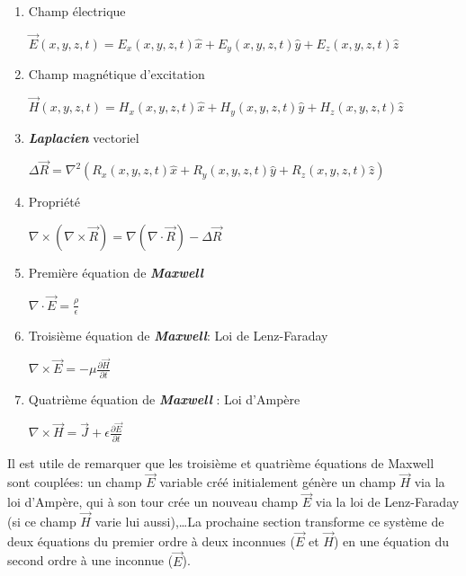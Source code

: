 \begin{enumerate}
\item{Champ électrique} \begin{center}$\vec{E}(x,y,z,t) = E_{x}(x,y,z,t) \hat{x} + E_{y}(x,y,z,t) \hat{y} + E_{z}(x,y,z,t) \hat{z}$\end{center} 
\item{Champ magnétique d'excitation } \begin{center}$\vec{H}(x,y,z,t) = H_{x}(x,y,z,t) \hat{x} + H_{y}(x,y,z,t) \hat{y} + H_{z}(x,y,z,t) \hat{z}$\end{center} 
\item{\textit{\textbf{Laplacien}} vectoriel} \begin{center} $\Delta \vec{R} = \nabla^{2}\left(R_{x}(x,y,z,t) \hat{x} + R_{y}(x,y,z,t) \hat{y} + R_{z}(x,y,z,t) \hat{z}\right) $\end{center} 
\item{Propriété} 
\begin{center}$\nabla \times (\nabla \times \vec{R}) = \nabla(\nabla \cdot \vec{R}) - \Delta \vec{R} $\end{center} 
\item{Première équation de \textit{\textbf{Maxwell}}} 
\begin{center}$\nabla \cdot \vec{E} = \frac{\rho}{\epsilon}$\end{center} 
\item{Troisième équation de \textit{\textbf{Maxwell}}: Loi de Lenz-Faraday}
\begin{center}
$\nabla \times \vec{E} = - \mu \frac{\partial \vec{H}}{\partial t}$
\end{center} 
\item{Quatrième équation de \textit{\textbf{Maxwell}} : Loi d'Ampère} \begin{center} $\nabla \times \vec{H} =  \vec{J} + \epsilon \frac{\partial \vec{E}}{\partial t}$\end{center} 
\end{enumerate}

Il est utile de remarquer que les troisième et quatrième équations de Maxwell sont couplées: un champ $\vec{E}$ variable créé initialement génère un champ $\vec{H}$ via la loi d'Ampère, qui à son tour crée un nouveau champ $\vec{E}$ via la loi de Lenz-Faraday (si ce champ $\vec{H}$ varie lui aussi),\ldots La prochaine section transforme ce système de deux équations du premier ordre à deux inconnues ($\vec{E}$ et  $\vec{H}$) en une équation du second ordre à une inconnue ($\vec{E}$).

